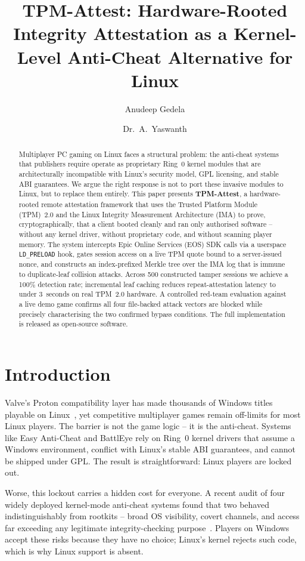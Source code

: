 \documentclass[11pt]{article}
\title{\textbf{TPM-Attest: Hardware-Rooted Integrity Attestation as a Kernel-Level Anti-Cheat Alternative for Linux}}
\author[1]{Anudeep Gedela}
\author[1,*]{Dr.\ A.\ Yaswanth}
\affil[1]{GITAM School of Technology, GITAM (Deemed to be University), Visakhapatnam, India}
\affil[*]{Corresponding author -- Assistant Professor, Department of Computer Science \& Engineering, \texttt{yamanapu@gitam.edu}}
\date{}
\begin{document}
\maketitle

\begin{abstract}
Multiplayer PC gaming on Linux faces a structural problem: the anti-cheat systems that publishers require operate as proprietary Ring~0 kernel modules that are architecturally incompatible with Linux's security model, GPL licensing, and stable ABI guarantees. We argue the right response is not to port these invasive modules to Linux, but to replace them entirely. This paper presents \textbf{TPM-Attest}, a hardware-rooted remote attestation framework that uses the Trusted Platform Module (TPM)~2.0 and the Linux Integrity Measurement Architecture (IMA) to prove, cryptographically, that a client booted cleanly and ran only authorised software -- without any kernel driver, without proprietary code, and without scanning player memory. The system intercepts Epic Online Services (EOS) SDK calls via a userspace \texttt{LD\_PRELOAD} hook, gates session access on a live TPM quote bound to a server-issued nonce, and constructs an index-prefixed Merkle tree over the IMA log that is immune to duplicate-leaf collision attacks. Across 500 constructed tamper sessions we achieve a 100\% detection rate; incremental leaf caching reduces repeat-attestation latency to under 3~seconds on real TPM~2.0 hardware. A controlled red-team evaluation against a live demo game confirms all four file-backed attack vectors are blocked while precisely characterising the two confirmed bypass conditions. The full implementation is released as open-source software.
\end{abstract}

\section{Introduction}
\label{sec:intro-ref}

Valve's Proton compatibility layer has made thousands of Windows titles playable on Linux~\cite{valve2018proton}, yet competitive multiplayer games remain off-limits for most Linux players. The barrier is not the game logic -- it is the anti-cheat. Systems like Easy Anti-Cheat and BattlEye rely on Ring~0 kernel drivers that assume a Windows environment, conflict with Linux's stable ABI guarantees, and cannot be shipped under GPL. The result is straightforward: Linux players are locked out.

Worse, this lockout carries a hidden cost for everyone. A recent audit of four widely deployed kernel-mode anti-cheat systems found that two behaved indistinguishably from rootkits -- broad OS visibility, covert channels, and access far exceeding any legitimate integrity-checking purpose~\cite{dorner2024rootkit}. Players on Windows accept these risks because they have no choice; Linux's kernel rejects such code, which is why Linux support is absent.
\end{document}
